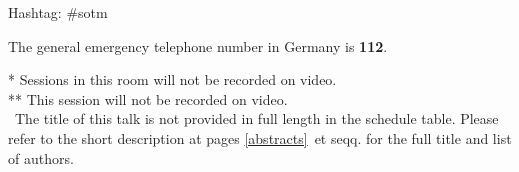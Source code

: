 \vfill
\noindent
Hashtag: \#sotm

\vspace*{0.8em}%
\noindent
The general emergency telephone number in Germany is \textbf{112}.
\vfill

\small{
\noindent
  \** Sessions in this room will not be recorded on video.\\
  \**\** This session will not be recorded on video.\\
  \diamondSymbol\ The title of this talk is not provided in full length in the schedule table. Please refer to the short description at pages \ref{abstracts}~et seqq. for the full title and list of authors.
}\normalsize


\newpage
